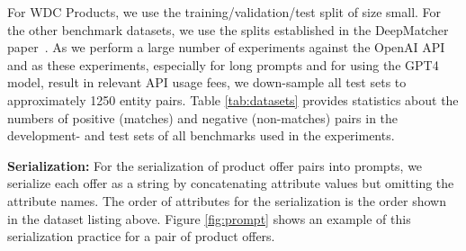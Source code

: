 \documentclass[sigconf,nonacm]{acmart}
\begin{document}
\begin{table}[]
\centering
\caption{Statistics for the development sets and test sets for all datasets. In-context example selection and fine-tuning is performed on the training part of the development split while prompts are evaluated on the test splits.}
\label{tab:datasets}
\end{table} 
For WDC Products, we use the training/validation/test split of size small.  For the other benchmark datasets, we use the splits established in the DeepMatcher paper~\cite{mudgalDeepLearningEntity2018}. As we perform a large number of experiments against the OpenAI API and as these experiments, especially for long prompts and for using the GPT4 model, result in relevant API usage fees, we down-sample all test sets to approximately 1250 entity pairs. Table \ref{tab:datasets} provides statistics about the numbers of positive (matches) and negative (non-matches) pairs in the development- and test sets of all benchmarks used in the experiments.

\textbf{Serialization:} For the serialization of product offer pairs into prompts, we serialize each offer as a string by concatenating attribute values but omitting the attribute names. The order of attributes for the serialization is the order shown in the dataset listing above. Figure \ref{fig:prompt} shows an example of this serialization practice for a pair of product offers. 
\end{document}
